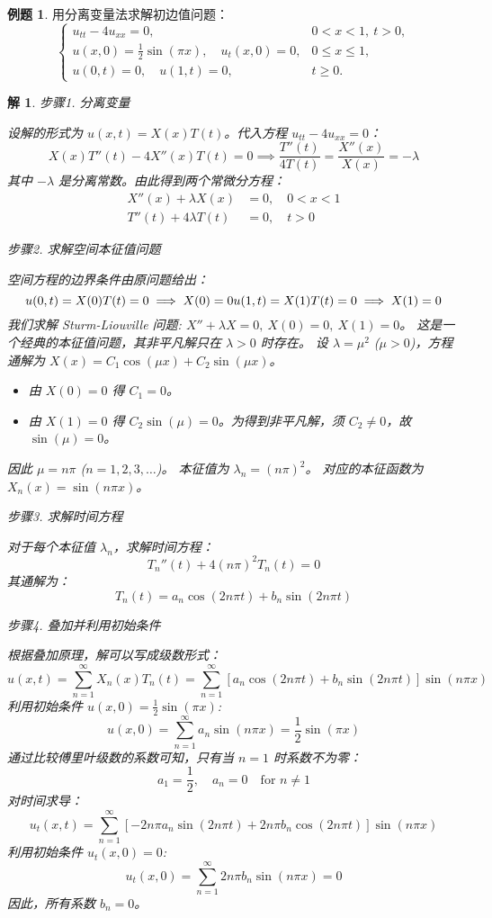 \documentclass[12pt,a4paper]{article}
\numberwithin{subsection}{section}
\numberwithin{subsubsection}{subsection}
\theoremstyle{plain}
\newtheorem{solution}{解}[subsection]
\theoremstyle{definition}
\newtheorem{example}{例题}[subsection]
\theoremstyle{remark}
\begin{document}
	
	\begin{example}
		用分离变量法求解初边值问题：
		\[
		\begin{cases}
			u_{tt} - 4u_{xx} = 0, & 0 < x < 1, \ t > 0, \\
			u(x, 0) = \frac{1}{2}\sin(\pi x), \quad u_t(x, 0) = 0, & 0 \leq x \leq 1, \\
			u(0, t) = 0, \quad u(1, t) = 0, & t \geq 0.
		\end{cases}
		\]
	\end{example}
	\begin{solution}
	步骤1. 分离变量
		
		\noindent
		设解的形式为 $u(x,t) = X(x)T(t)$。代入方程 $u_{tt} - 4u_{xx} = 0$：
		\[
		X(x)T''(t) - 4X''(x)T(t) = 0 \implies \frac{T''(t)}{4T(t)} = \frac{X''(x)}{X(x)} = -\lambda
		\]
		其中 $-\lambda$ 是分离常数。由此得到两个常微分方程：
		\begin{align*}
			X''(x) + \lambda X(x) &= 0, \quad 0 < x < 1 \\
			T''(t) + 4\lambda T(t) &= 0, \quad t > 0
		\end{align*}
		
		
	步骤2. 求解空间本征值问题
		
		\noindent
		空间方程的边界条件由原问题给出：
		\[
		u(0,t) = X(0)T(t) = 0 \implies X(0)=0 \\
		u(1,t) = X(1)T(t) = 0 \implies X(1)=0
		\]
		我们求解 Sturm-Liouville 问题: $X'' + \lambda X = 0, \ X(0)=0, \ X(1)=0$。
		这是一个经典的本征值问题，其非平凡解只在 $\lambda > 0$ 时存在。
		设 $\lambda = \mu^2$ ($\mu>0$)，方程通解为 $X(x) = C_1 \cos(\mu x) + C_2 \sin(\mu x)$。
		\begin{itemize}
			\item 由 $X(0)=0$ 得 $C_1 = 0$。
			\item 由 $X(1)=0$ 得 $C_2 \sin(\mu) = 0$。为得到非平凡解，须 $C_2 \neq 0$，故 $\sin(\mu)=0$。
		\end{itemize}
		因此 $\mu = n\pi$ ($n=1, 2, 3, \dots$)。
		本征值为 $\lambda_n = (n\pi)^2$。
		对应的本征函数为 $X_n(x) = \sin(n\pi x)$。
		

		
		步骤3. 求解时间方程
		
		\noindent
		对于每个本征值 $\lambda_n$，求解时间方程：
		\[
		T_n''(t) + 4(n\pi)^2 T_n(t) = 0
		\]
		其通解为：
		\[
		T_n(t) = a_n \cos(2n\pi t) + b_n \sin(2n\pi t)
		\]
		
	步骤4. 叠加并利用初始条件
		
		\noindent
		根据叠加原理，解可以写成级数形式：
		\[
		u(x,t) = \sum_{n=1}^\infty X_n(x)T_n(t) = \sum_{n=1}^\infty [a_n \cos(2n\pi t) + b_n \sin(2n\pi t)] \sin(n\pi x)
		\]
		利用初始条件 $u(x,0) = \frac{1}{2}\sin(\pi x)$:
		\[
		u(x,0) = \sum_{n=1}^\infty a_n \sin(n\pi x) = \frac{1}{2}\sin(\pi x)
		\]
		通过比较傅里叶级数的系数可知，只有当 $n=1$ 时系数不为零：
		\[
		a_1 = \frac{1}{2}, \quad a_n = 0 \quad \text{for } n \neq 1
		\]
		对时间求导：
		\[
		u_t(x,t) = \sum_{n=1}^\infty [-2n\pi a_n \sin(2n\pi t) + 2n\pi b_n \cos(2n\pi t)] \sin(n\pi x)
		\]
		利用初始条件 $u_t(x,0) = 0$:
		\[
		u_t(x,0) = \sum_{n=1}^\infty 2n\pi b_n \sin(n\pi x) = 0
		\]
		因此，所有系数 $b_n=0$。
		

\end{solution}
\end{document}
